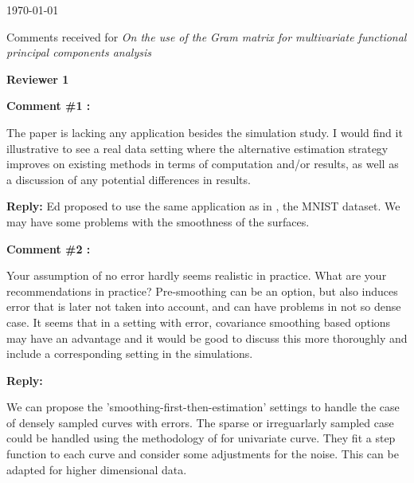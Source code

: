 \documentclass[11pt]{article}
\begin{document}
\newcommand{\thedate}{\today}

\thedate


\begin{center}
{\large Comments received for \emph{On the use of the Gram matrix for multivariate functional principal components analysis}}\\
\end{center} 

\vspace*{1cm}


{\large \textbf{Reviewer 1} }


\bigskip

\itshape


\textbf{Comment \#1 :}

The paper is lacking any application besides the simulation study. I would find it illustrative to see a real data setting where the alternative estimation strategy improves on existing methods in terms of computation and/or results, as well as a discussion of any potential differences in results.

\medskip

\normalfont

\textbf{Reply:} Ed proposed to use the same application as in \cite{shiTwoDimensionalFunctionalPrincipal2022}, the MNIST dataset. We may have some problems with the smoothness of the surfaces.

\bigskip

\itshape

\textbf{Comment \#2 :}

Your assumption of no error hardly seems realistic in practice. What are your recommendations in practice? Pre-smoothing can be an option, but also induces error that is later not taken into account, and can have problems in not so dense case. It seems that in a setting with error, covariance smoothing based options may have an advantage and it would be good to discuss this more thoroughly and include a corresponding setting in the simulations.

\medskip

\normalfont

\textbf{Reply:}

We can propose the 'smoothing-first-then-estimation' settings to handle the  case of densely sampled curves with errors. The sparse or irreguarlarly sampled case could be handled using the methodology of \cite{benkoCommonFunctionalPrincipal2009} for univariate curve. They fit a step function to each curve and consider some adjustments for the noise. This can be adapted for higher dimensional data.
\bigskip
\end{document}
